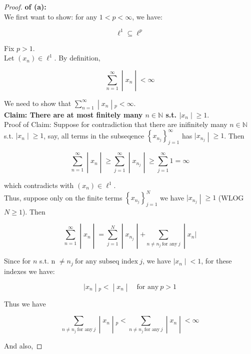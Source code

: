 \documentclass{qlnotes-export}
\begin{document}
\begin{proof}

\textbf{of (a):}\\
We first want to show: for any \(1 < p < \infty\), we have:

\[\ell^{1} \subseteq \ell^{p}\]

Fix \(p > 1\).\\
Let \((x_{n}) \in \ell^{1}\). By definition,

\[\left. \sum\limits_{n = 1}^{\infty} \middle| x_{n} \middle| < \infty \right.\]

We need to show that \(\left. \sum_{n = 1}^{\infty} \middle| x_{n} \middle| {}_{p} < \infty \right.\).\\
\textbf{Claim: There are at most finitely many \(n \in {\mathbb{N}}\) s.t. \(\left. |x_{n} \middle| \geq 1 \right.\)}.\\
Proof of Claim: Suppose for contradiction that there are inifinitely many \(n \in {\mathbb{N}}\) s.t. \(\left. |x_{n} \middle| \geq 1 \right.\), say, all terms in the subseqence \(\left\{ x_{n_{j}} \right\}_{j = 1}^{\infty}\) has \(\left. |x_{n_{j}} \middle| \geq 1 \right.\). Then

\[\left. \sum\limits_{n = 1}^{\infty} \middle| x_{n} \middle| \geq \sum\limits_{j = 1}^{\infty} \middle| x_{n_{j}} \middle| \geq \sum\limits_{j = 1}^{\infty}1 = \infty \right.\]

which contradicts with \((x_{n}) \in \ell^{1}\).\\
Thus, suppose only on the finite terms \(\left\{ x_{n_{j}} \right\}_{j = 1}^{N}\) we have \(\left. |x_{n_{j}} \middle| \geq 1 \right.\) (WLOG \(N \geq 1\)). Then

\[\left. \sum\limits_{n = 1}^{\infty} \middle| x_{n} \middle| = \sum\limits_{j = 1}^{N} \middle| x_{n_{j}} \middle| + \sum\limits_{n \neq n_{j}\ \text{for any}\ j} \middle| x_{n}| \right.\]

Since for \(n\) s.t. n \(\neq n_{j}\ \text{for any subseq index}\ j\), we have \(\left. |x_{n} \middle| < 1 \right.\), for these indexes we have:

\[\left. |x_{n} \middle| {}_{p} < \middle| x_{n} \middle| \quad\text{for any}\ p > 1 \right.\]

Thus we have

\[\left. \sum\limits_{n \neq n_{j}\ \text{for any}\ j} \middle| x_{n} \middle| {}_{p} < \sum\limits_{n \neq n_{j}\ \text{for any}\ j} \middle| x_{n} \middle| < \infty \right.\]

And also,


\end{proof}
\end{document}

